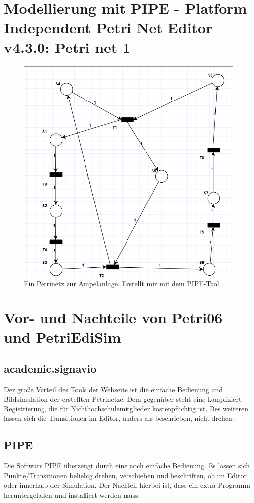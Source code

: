 \documentclass{article}
\begin{document}
	\section{Modellierung mit PIPE - Platform Independent Petri Net Editor v4.3.0: Petri net 1}
		\begin{figure}[h]
			\includegraphics[scale=0.55, center]{petrinet_02_software.png}
			\caption{Ein Petrinetz zur Ampelanlage. Erstellt mir mit dem PIPE-Tool.}
			\label{fig_4: petrinet_02_PIPE}
		\end{figure}
\newpage
	\section{Vor- und Nachteile von Petri06 und PetriEdiSim}
		\subsection*{academic.signavio}
			Der große Vorteil des Tools der Webseite ist die einfache Bedienung und Bildsimulation der erstellten Petrinetze. Dem gegenüber steht eine kompliziert Registrierung, die für Nichthochschulemitglieder kostenpflichtig ist. Des weiteren lassen sich die Transitionen im Editor, anders als beschrieben, nicht drehen.
		\subsection*{PIPE}
			Die Software PIPE überzeugt durch eine noch einfache Bedienung. Es lassen sich Punkte/Transitionen beliebig drehen, verschieben und beschriften, ob im Editor oder innerhalb der Simulation.
			Der Nachteil hierbei ist, dass ein extra Programm heruntergeladen und installiert werden muss.
	
\end{document}
